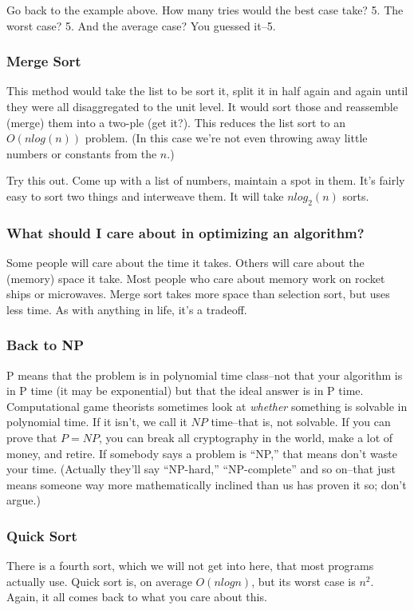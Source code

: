 \documentclass[12pt,letter]{article}
\begin{document}
Go back to the example above. How many tries would the best case take?
5. The worst case? 5. And the average case? You guessed it--5. 

\subsubsection{Merge Sort}

This method would take the list to be sort it, split it in half again
and again until they were all disaggregated to the unit level. It would sort those and
reassemble (merge) them into a two-ple (get it?). This reduces the
list sort to an $O(n log(n))$ problem. (In this case we're not even
throwing away little numbers or constants from the $n$.)

Try this out. Come up with a list of numbers, maintain a spot in
them. It's fairly easy to sort two things and interweave them. It will
take $n log_2(n)$ sorts. 



\subsubsection{What should I care about in optimizing an algorithm?}
Some people will care about the time it takes. Others will care about
the (memory) space it take. Most people who care about memory work on rocket
ships or microwaves. Merge sort takes more space than selection sort,
but uses less time. As with anything in life, it's a tradeoff. 

\subsubsection{Back to NP}
P means that the problem is in polynomial time class--not that your
algorithm is in P time (it may be exponential) but that the ideal
answer is in P time. Computational game theorists sometimes look at
\emph{whether} something is solvable in polynomial time. If it isn't,
we call it $NP$ time--that is, not solvable. If you can prove that
$P=NP$, you can break all cryptography in the world, make a lot of
money, and retire. If somebody says a problem is ``NP,'' that means
don't waste your time. (Actually they'll say ``NP-hard,''
``NP-complete'' and so on--that just means someone way more
mathematically inclined than us has proven it so; don't argue.)

\subsubsection{Quick Sort}
There is a fourth sort, which we will not get into here, that most
programs actually use. Quick sort is, on average $O (n log n)$, but
its worst case is $n^2$. Again, it all comes back to what you care
about this.
\end{document}
